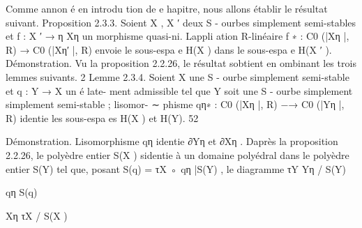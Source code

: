 \documentclass[
  10pt,
]{article}
\newenvironment{Shaded}{}{}
\newcommand{\NormalTok}[1]{#1}
\begin{document}
\begin{Shaded}
\begin{Highlighting}[]
\NormalTok{    Comme annon é en introdu tion de e hapitre, nous allons établir le résultat suivant.}
\NormalTok{Proposition 2.3.3.  Soient X , X}
\NormalTok{                                       ′ deux S {-} ourbes simplement semi{-}stables et f : X ′ →}
\NormalTok{                                                                                             η}
\NormalTok{Xη un morphisme quasi{-}ni. L\textquotesingle{}appli ation R{-}linéaire f ∗ : C0 (|Xη |, R) → C0 (|Xη′ |, R) envoie le}
\NormalTok{sous{-}espa e H(X ) dans le sous{-}espa e H(X ′ ).}
\NormalTok{Démonstration. Vu la proposition 2.2.26, le résultat s\textquotesingle{}obtient en ombinant les trois lemmes}
\NormalTok{suivants.                                                                                       2}
\NormalTok{Lemme 2.3.4.  Soient X         une S {-} ourbe simplement semi{-}stable et q : Y → X un é late{-}}
\NormalTok{ment admissible tel que Y soit une S {-} ourbe simplement simplement semi{-}stable ; l\textquotesingle{}isomor{-}}
\NormalTok{                            ∼}
\NormalTok{phisme qη∗ : C0 (|Xη |, R) −→ C0 (|Yη |, R) identie les sous{-}espa es H(X ) et H(Y).}
\NormalTok{52}



\NormalTok{Démonstration. L\textquotesingle{}isomorphisme qη identie ∂Yη et ∂Xη .}
\NormalTok{  D\textquotesingle{}après la proposition 2.2.26, le polyèdre entier S(X ) s\textquotesingle{}identie à un domaine polyédral}
\NormalTok{dans le polyèdre entier S(Y) tel que, posant S(q) = τX ◦ qη |S(Y) , le diagramme}
\NormalTok{                                                    τY}
\NormalTok{                                           Yη            / S(Y)}

\NormalTok{                                       qη                           S(q)}
                                                               
\NormalTok{                                           Xη       τX}
\NormalTok{                                                         / S(X )}


\end{Highlighting}
\end{Shaded}
\end{document}
